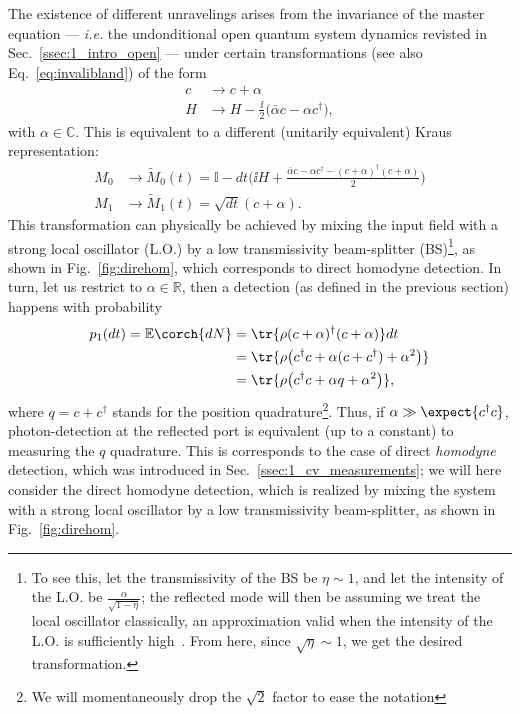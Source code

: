 The existence of different unravelings arises from the invariance of the master equation --- \textit{i.e.} the undonditional open quantum system dynamics revisted in Sec.~\ref{ssec:1_intro_open} --- under certain transformations (see also Eq.~\ref{eq:invalibland}) of the form
\begin{align}
c &\rightarrow c + \alpha \\
H &\rightarrow H - \frac{\ii}{2}\big(\bar{\alpha}c - \alpha c^\dagger),
\end{align}
with $\alpha \in \mathbb{C}$. This is equivalent to a different (unitarily equivalent) Kraus representation:
\begin{align}\label{eq:homPOM}
M_0 &\rightarrow\tilde{M}_0(t) = \mathbb{I} - dt\big(\ii H + \frac{\bar{\alpha}c - \alpha c^\dagger - (c+\alpha)^\dagger(c+\alpha)}{2}) \\
M_1  &\rightarrow \tilde{M}_1(t) = \sqrt{dt}(c+\alpha).
\end{align}
This transformation can physically be achieved by mixing the input field with a strong local oscillator (L.O.) by a low transmissivity beam-splitter (BS)\footnote{To see this, let the transmissivity of the BS be $\eta\sim1$, and let the intensity of the L.O. be $\frac{\alpha}{\sqrt{1-\eta}}$; the reflected mode will then be assuming we treat the local oscillator classically, an approximation valid when the intensity of the L.O. is sufficiently high~\cite{serafiniBOOK}. From here, since $\sqrt{\eta}\sim1$, we get the desired transformation.}, as shown in Fig.~\ref{fig:direhom}, which corresponds to direct homodyne detection. In turn, let us restrict to $\alpha\in\mathbb{R}$, then a detection (as defined in the previous section) happens with probability
\begin{align}
p_1(dt) = \mathbb{E}\corch{dN} &= \tr{\rho (c+\alpha)^\dagger(c+\alpha)} dt \\
&= \tr{\rho \big(c^\dagger c + \alpha (c+c^\dagger) + \alpha^2\big)}\\
&= \tr{\rho \big(c^\dagger c +  \alpha q + \alpha^2\big)},
\end{align}
where $q = c+c^\dagger$ stands for the position quadrature\footnote{We will momentaneously drop the $\sqrt{2}$ factor to ease the notation}. Thus, if $\alpha\gg\expect{c^\dagger c}$, photon-detection at the reflected port is equivalent (up to a constant) to measuring the $q$ quadrature. This is corresponds to the case of direct \textit{homodyne} detection, which was introduced in Sec.~\ref{ssec:1_cv_measurements}; we will here consider the direct homodyne detection, which is realized by mixing the system with a strong local oscillator by a low transmissivity beam-splitter, as shown in Fig.~\ref{fig:direhom}.


